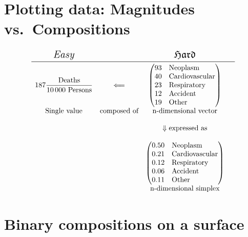 \documentclass{beamer}
\begin{document}
\section{Plotting data: Magnitudes vs.~Compositions} %

\begin{frame}
\frametitle{\insertsection}

$$
\begin{matrix*}[c]
\mbox{\Large$\mathit{Easy}$} & & \mbox{\Large$\mathfrak{Hard}$} \\\midrule
187 \dfrac {\text{Deaths}} {10\,000~\text{Persons}} &
\Longleftarrow &
\begin{pmatrix*}[l]
93 & \text{Neoplasm} \\
40 & \text{Cardiovascular} \\
23 & \text{Respiratory} \\
12 & \text{Accident} \\
19 & \text{Other}
\end{pmatrix*} \\
\text{Single~value} & \text{composed~of} & \text{n-dimensional~vector} \\
& & & \\
& & \Downarrow \text{expressed~as} \\
& & & \\
& & \begin{pmatrix*}[l]
0.50 & \text{Neoplasm} \\
0.21 & \text{Cardiovascular} \\
0.12 & \text{Respiratory} \\
0.06 & \text{Accident} \\
0.11 & \text{Other}
\end{pmatrix*} \\
& & \text{n-dimensional simplex}
\end{matrix*}
$$

\end{frame}

\section{Binary compositions on a surface} %
\end{document}
